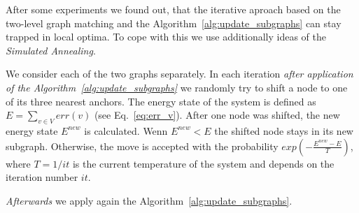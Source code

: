 After some experiments we found out, that the iterative aproach based on the two-level graph matching and the Algorithm~\ref{alg:update_subgraphs} can stay trapped in local optima.
To cope with this we use additionally ideas of the \emph{Simulated Annealing}.

We consider each of the two graphs separately. In each iteration \emph{after application of the Algorithm~\ref{alg:update_subgraphs}} we randomly try to shift a node to one of its three nearest anchors. The energy state of the system is defined as $E = \sum_{v\in V}err(v)$ (see Eq.~\ref{eq:err_v}). After one node was shifted, the new energy state $E^{new}$ is calculated. Wenn $E^{new}<E$ the shifted node stays in its new subgraph. Otherwise, the move is accepted with the probability $exp(-\frac{E^{new}-E}{T})$, where $T = 1/{it}$ is the current temperature of the system and depends on the iteration number $it$. 

\emph{Afterwards} we apply again the Algorithm~\ref{alg:update_subgraphs}. 

